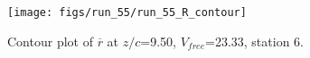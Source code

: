 \begin{figure}[H]
\centering
\texttt{[image: figs/run\_55/run\_55\_R\_contour]}
\caption{Contour plot of $\overline{r}$ at $z/c$=9.50, $V_{free}$=23.33, station 6.}
\label{fig:run_55_R_contour}
\end{figure}



